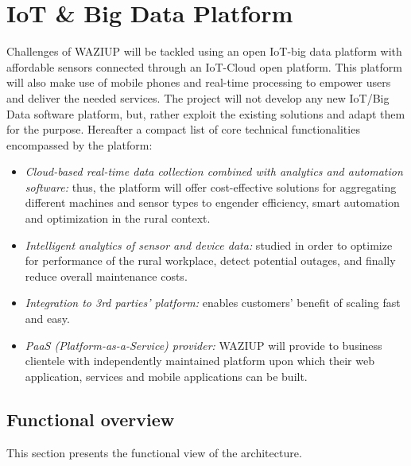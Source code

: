 
\section{IoT \& Big Data Platform}
\label{sec:platform}

Challenges of WAZIUP will be tackled using an open IoT-big data platform with affordable sensors connected through an IoT-Cloud open platform.
This platform will also make use of mobile phones and real-time processing to empower users and deliver the needed services.
The project will not develop any new IoT/Big Data software platform, but, rather exploit the existing solutions and adapt them for the purpose. Hereafter a compact list of core technical functionalities encompassed by the platform:

\begin{itemize}
   \item \emph{Cloud-based real-time data collection combined with analytics and automation software:} thus, the platform will offer cost-effective solutions for aggregating different machines and sensor types to engender efficiency, smart automation and optimization in the rural context.
   \item \emph{Intelligent analytics of sensor and device data:} studied in order to optimize for performance of the rural workplace, detect potential outages, and finally reduce overall maintenance costs.
   \item \emph{Integration to 3rd parties' platform:} enables customers' benefit of scaling fast and easy.
   \item \emph{PaaS (Platform-as-a-Service) provider:} WAZIUP will provide to business clientele with independently maintained platform upon which their web application, services and mobile applications can be built.
\end{itemize}

\subsection{Functional overview}
This section presents the functional view of the architecture. 

